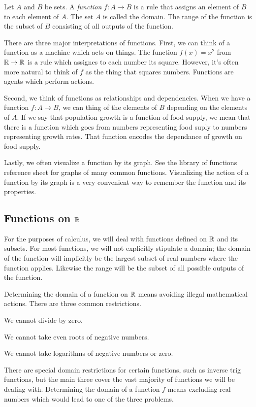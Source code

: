 \documentclass[fleqn]{report}
\begin{document}
Let $A$ and $B$ be sets. 
A \emph{function} $f: A \rightarrow B$ is a rule that assigns an
element of $B$ to each element of $A$. The set $A$ is called
the domain. The range of the function is the subset of $B$
consisting of all outputs of the function.

There are three major interpretations of functions.
First, we can think of a function as a machine which acts on
things. The function $f(x) = x^2$ from $\mathbb{R} \rightarrow
\mathbb{R}$ is a rule which assignes to each number its square.
However, it's often more natural to think of $f$ as the thing that
squares numbers. Functions are agents which
perform actions. 

Second, we think of functions as relationships and
dependencies. When we have a function $f: A \rightarrow B$,
we can thing of the elements of $B$ depending on the elements
of $A$. If we say that population growth is a function of
food supply, we mean that there is a function which goes from
numbers representing food suply to numbers representing growth
rates. That function encodes the dependance of growth on food
supply.

Lastly, we often visualize a function by its graph. See the
library of functions reference sheet for graphs of many common
functions. Visualizing the action of a function by its graph is
a very convenient way to remember the function and its
properties.

\subsection{Functions on $\mathbb{R}$}
\label{real-functions}

For the purposes of calculus, we will deal with functions
defined on $\mathbb{R}$ and its subsets. For most functions, we will
not explicitly stipulate a domain; the domain of the function
will implicitly be the largest subset of real numbers where
the function applies. Likewise the range will be the subset
of all possible outputs of the function.

Determining the domain of a function on $\mathbb{R}$ means avoiding
illegal mathematical actions. There are three common restrictions.
\begin{smallitemize}
\item We cannot divide by zero.
\item We cannot take even roots of negative numbers.
\item We cannot take logarithms of negative numbers or zero.
\end{smallitemize}
There are special domain restrictions for certain
functions, such as inverse trig functions, but the main three
cover the vast majority of functions we will be dealing with.
Determining the domain of a function $f$ means excluding real
numbers which would lead to one of the three problems.
\end{document}
